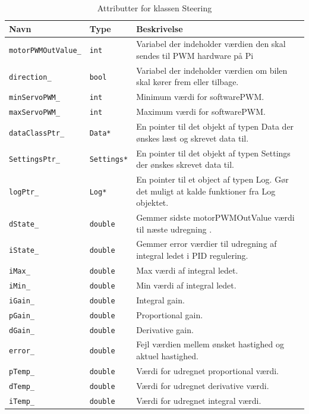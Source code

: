 \begin{table}[H]
\begin{tabularx}{\textwidth}{| l | l | Z |} \hline
Navn & Type & Beskrivelse \\\hline
\texttt{motorPWMOutValue\_} & \texttt{int} &Variabel der indeholder værdien den skal sendes til PWM hardware på Pi \\\hline
\texttt{direction\_} & \texttt{bool} &Variabel der indeholder værdien om bilen skal kører frem eller tilbage.\\\hline
\texttt{minServoPWM\_} & \texttt{int} &Minimum værdi for softwarePWM.\\\hline
\texttt{maxServoPWM\_} & \texttt{int} &Maximum værdi for softwarePWM.\\\hline
\texttt{dataClassPtr\_} & \texttt{Data*} &En pointer til det objekt af typen Data der ønskes læst og skrevet data til.\\\hline
\texttt{SettingsPtr\_} & \texttt{Settings*} &En pointer til det objekt af typen Settings der ønskes skrevet data til.\\\hline
\texttt{logPtr\_} & \texttt{Log*} &En pointer til et object af typen Log. Gør det muligt at kalde funktioner fra Log objektet.\\\hline
\texttt{dState\_} & \texttt{double } &Gemmer sidste motorPWMOutValue værdi til næste udregning .\\\hline
\texttt{iState\_} & \texttt{double} &Gemmer error værdier til udregning af integral ledet i PID regulering.\\\hline
\texttt{iMax\_} & \texttt{double } &Max værdi af integral ledet.\\\hline
\texttt{iMin\_} & \texttt{double } &Min værdi af integral ledet.\\\hline
\texttt{iGain\_} & \texttt{double } &Integral gain.\\\hline
\texttt{pGain\_} & \texttt{double } &Proportional gain.\\\hline
\texttt{dGain\_} & \texttt{double } &Derivative gain.\\\hline
\texttt{error\_} & \texttt{double } &Fejl værdien mellem ønsket hastighed og aktuel hastighed.\\\hline
\texttt{pTemp\_} & \texttt{double } &Værdi for udregnet proportional værdi.\\\hline
\texttt{dTemp\_} & \texttt{double } &Værdi for udregnet derivative værdi.\\\hline
\texttt{iTemp\_} & \texttt{double } &Værdi for udregnet integral værdi.\\\hline


\end{tabularx}
\caption{Attributter for klassen Steering}
\label{table:attr_steering}
\end{table}

